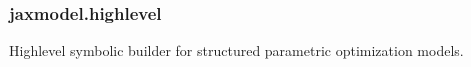 \documentclass[letterpaper,10pt,english,openany,oneside]{sphinxmanual}
\begin{document}
\sphinxstepscope


\subsubsection{jaxmodel.highlevel}
\label{\detokenize{api/core/jaxmodel/highlevel:module-jaxmodel.highlevel}}\label{\detokenize{api/core/jaxmodel/highlevel:jaxmodel-highlevel}}\label{\detokenize{api/core/jaxmodel/highlevel::doc}}
\sphinxAtStartPar
High\sphinxhyphen{}level symbolic builder for structured parametric optimization models.
\end{document}
